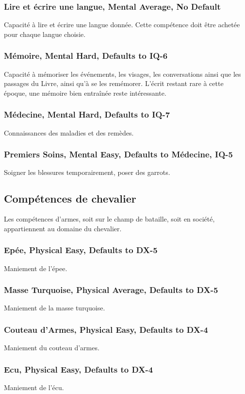     \subsubsection*{Lire et écrire une langue, Mental Average, No Default}
    Capacité à lire et écrire une langue donnée. Cette compétence doit
    être achetée pour chaque langue choisie.
    \subsubsection*{Mémoire, Mental Hard, Defaults to IQ-6}
    Capacité à mémoriser les événements, les visages, les conversations ainsi
    que les passages du Livre, ainsi qu'à se les remémorer. L'écrit restant
    rare à cette époque, une mémoire bien entraînée reste intéressante.
    \subsubsection*{Médecine, Mental Hard, Defaults to IQ-7}
    Connaissances des maladies et des remèdes.
    \subsubsection*{Premiers Soins, Mental Easy, Defaults to Médecine, IQ-5}
    Soigner les blessures temporairement, poser des garrots.

    \subsection*{Compétences de chevalier}\label{subsec:comp-chevalier}
    Les compétences d'armes, soit sur le champ de bataille, soit en société,
    appartiennent au domaine du chevalier.
    \subsubsection*{Epée, Physical Easy, Defaults to DX-5}
    Maniement de l'épee.
    \subsubsection*{Masse Turquoise, Physical Average, Defaults to DX-5}
    Maniement de la masse turquoise.
    \subsubsection*{Couteau d'Armes, Physical Easy, Defaults to DX-4}
    Maniement du couteau d'armes.
    \subsubsection*{Ecu, Physical Easy, Defaults to DX-4}
    Maniement de l'écu.
